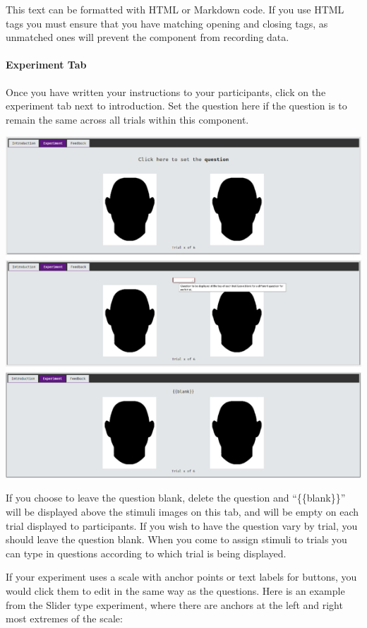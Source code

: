 \documentclass[]{book}
\let\oldparagraph\paragraph
\renewcommand{\paragraph}[1]{\oldparagraph{#1}\mbox{}}
\begin{document}
This text can be formatted with HTML or Markdown code. If you use HTML
tags you must ensure that you have matching opening and closing tags, as
unmatched ones will prevent the component from recording data.

\paragraph{Experiment Tab}\label{experiment-tab}

Once you have written your instructions to your participants, click on
the experiment tab next to introduction. Set the question here if the
question is to remain the same across all trials within this component.

\includegraphics{images/screenshots/exp_9.png}

If you choose to leave the question blank, delete the question and
``\{\{blank\}\}'' will be displayed above the stimuli images on this
tab, and will be empty on each trial displayed to participants. If you
wish to have the question vary by trial, you should leave the question
blank. When you come to assign stimuli to trials you can type in
questions according to which trial is being displayed.

If your experiment uses a scale with anchor points or text labels for
buttons, you would click them to edit in the same way as the questions.
Here is an example from the Slider type experiment, where there are
anchors at the left and right most extremes of the scale:
\end{document}
